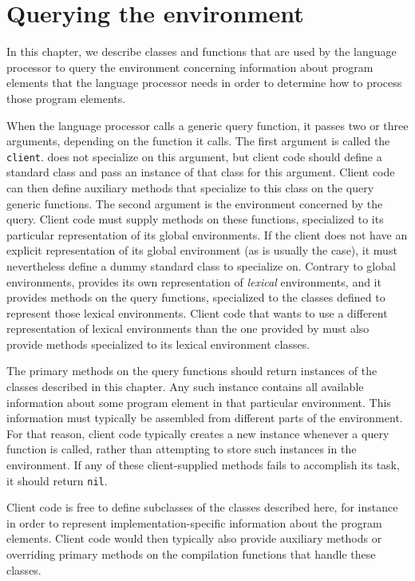 \chapter{Querying the environment}

\label{chap-environment-querying}

In this chapter, we describe classes and functions that are used by
the language processor to query the environment concerning information about
program elements that the language processor needs in order to determine how to
process those program elements.

When the language processor calls a generic query function, it passes two or
three arguments, depending on the function it calls.  The first
argument is called the \texttt{client}.  \sysname{} does not
specialize on this argument, but client code should define a standard
class and pass an instance of that class for this argument.  Client
code can then define auxiliary methods that specialize to this class
on the query generic functions.  The second argument is the
environment concerned by the query.  Client code must supply methods
on these functions, specialized to its particular representation of
its global environments.  If the client does not have an explicit
representation of its global environment (as is usually the case), it
must nevertheless define a dummy standard class to specialize on.
Contrary to global environments, \sysname{} provides its own
representation of \emph{lexical} environments, and it provides methods
on the query functions, specialized to the classes defined to
represent those lexical environments.  Client code that wants
to use a different representation of lexical environments than the one
provided by \sysname{} must also provide methods specialized to its
lexical environment classes.

The primary methods on the query functions should return instances of
the classes described in this chapter.  Any such instance contains all
available information about some program element in that particular
environment.  This information must typically be assembled from
different parts of the environment.  For that reason, client code
typically creates a new instance whenever a query function is called,
rather than attempting to store such instances in the environment.  If
any of these client-supplied methods fails to accomplish its task, it
should return \texttt{nil}.

Client code is free to define subclasses of the classes described
here, for instance in order to represent implementation-specific
information about the program elements.  Client code would then
typically also provide auxiliary methods or overriding primary methods
on the compilation functions that handle these classes.

